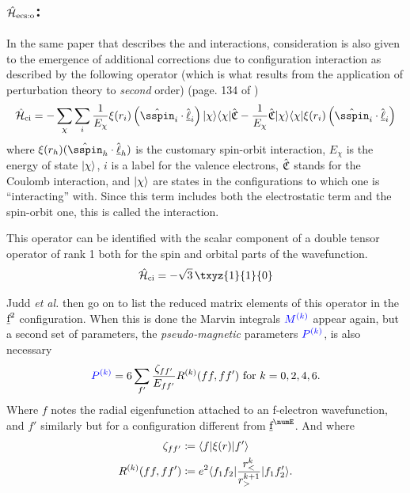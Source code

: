 \documentclass{article}
\begin{document}
\subsection{$\hat{\mathcal{H}}_{\text{ecs:o}}$: \ecso}

    In the same paper \cite{judd_intra-atomic_1968} that describes the \spinspin and \soo interactions, consideration is also given to the emergence of additional corrections due to configuration interaction as described by the following operator (which is what results from the application of perturbation theory to \textit{second} order) (page.  134 of \cite{judd_intra-atomic_1968})
    \begin{equation}
        \ham_{\text{ci}} = -\sum_\chi \sum_i \frac{1}{E_\chi}\xi(r_i) 
            \left(  
                \op{\sspin}_i\cdot\op{\lorb}_i
            \right) \ket{\chi} \bra{\chi} \CoulombNonCentral
            - \frac{1}{E_\chi}\CoulombNonCentral \ket{\chi}\bra{\chi} \xi(r_i) 
                \left( 
                    \op{\sspin}_i\cdot\op{\lorb}_i
                \right) 
    \end{equation} 
    where $\xi(r_h) (\op{\sspin}_h\cdot\op{\lorb}_h)$ is the customary spin-orbit interaction, $E_\chi$ is the energy of state $|\chi\rangle$, $i$ is a label for the valence electrons, $\hat{\mathfrak{C}}$ stands for the Coulomb interaction, and $|\chi\rangle$ are states in the configurations to which one is ``interacting'' with. Since this term includes both the electrostatic term and the spin-orbit one, this is called the \ecso interaction.

    This operator can be identified with the scalar component of a double tensor operator of rank 1 both for the spin and orbital parts of the wavefunction. 
    \begin{equation}
        \ham_{\text{ci}} = - \sqrt{3}\,\txyz{1}{1}{0}
    \end{equation}

    Judd \textit{et al.} then go on to list the reduced matrix elements of this operator in the $\underbar{$\text{f}$}^2$ configuration. When this is done the Marvin integrals $\textcolor{blue}{M^{(k)}}$ appear again, but a second set of parameters, the \textit{pseudo-magnetic} parameters $\textcolor{blue}{P^{(k)}}$, is also necessary
    \begin{equation}
        \textcolor{blue}{P^{(k)}} = 6 \sum_{f'}
            \frac{\zeta_{ff'}}
                {E_{ff'}}
                R^{(k)}(ff,ff') \text{ for }k=0,2,4,6.
    \end{equation}
    Where $f$ notes the radial eigenfunction attached to an f-electron wavefunction, and $f'$ similarly but for a configuration different from $\forb^\numE$. And where
    \begin{align}
        \zeta_{ff'} &\coloneqq \langle f|\xi(r)|f'\rangle \\
        R^{(k)}(ff,ff') &\coloneqq e^2 \langle f_1f_2|\frac{r_<^k}{r_>^{k+1}}|f_1f_2'\rangle.
    \end{align}
\end{document}
